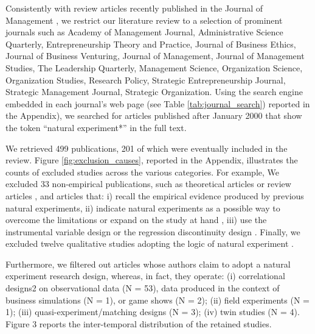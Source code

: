 Consistently with review articles recently published in the Journal of
Management \parencite[e.g.][]{gonzalez2018,rindova2018}, we restrict our
literature review to a selection of prominent journals such as Academy of
Management Journal, Administrative Science Quarterly, Entrepreneurship Theory
and Practice, Journal of Business Ethics, Journal of Business Venturing, Journal
of Management, Journal of Management Studies, The Leadership Quarterly,
Management Science, Organization Science, Organization Studies, Research Policy,
Strategic Entrepreneurship Journal, Strategic Management Journal, Strategic
Organization.  Using the search engine embedded in each journal's web page (see
Table \ref{tab:journal_search}) reported in the Appendix), we searched for
articles published after January 2000 that show the token ``natural
experiment*'' in the full text.

We retrieved 499 publications, 201 of which were eventually included in the
review. Figure \ref{fig:exclusion_causes}, reported in the Appendix, illustrates
the counts of excluded studies across the various categories. For example,
 We excluded 33 non-empirical publications, such as theoretical articles
\parencite[e.g.,][]{makadok2011} or review articles
\parencite[e.g.,][]{shaver2020}, and articles that: i) recall the empirical
evidence produced by previous natural experiments, ii) indicate natural
experiments as a possible way to overcome the limitations or expand on the study
at hand \parencite[e.g.,][]{hsu2006}, iii) use the instrumental variable design
\parencite[e.g.,][]{zoloty2018} or the regression discontinuity design
\parencite[e.g.,][]{flammer2015}. Finally, we excluded twelve qualitative studies
adopting the logic of natural experiment \parencite[e.g.,][]{powell2017}.

Furthermore, we filtered out articles whose authors claim to adopt a natural
experiment research design, whereas, in fact, they operate: (i) correlational
designs2 on observational data (N = 53), data produced in the context of
business simulations (N = 1), or game shows (N = 2); (ii) field experiments (N =
1); (iii) quasi-experiment/matching designs (N = 3); (iv) twin studies (N = 4).
Figure 3 reports the inter-temporal distribution of the retained studies.

